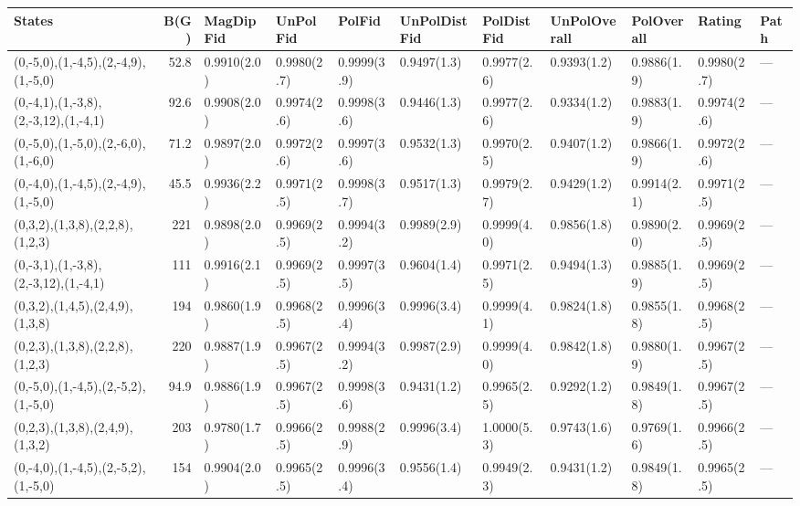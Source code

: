 \begin{tabular}{lrlllllllll}
\hline
 States                                &   B(G) & MagDipFid   & UnPolFid    & PolFid      & UnPolDistFid   & PolDistFid   & UnPolOverall   & PolOverall   & Rating      & Path   \\
\hline
 (0,-5,0),(1,-4,5),(2,-4,9),(1,-5,0)   &   52.8 & 0.9910(2.0) & 0.9980(2.7) & 0.9999(3.9) & 0.9497(1.3)    & 0.9977(2.6)  & 0.9393(1.2)    & 0.9886(1.9)  & 0.9980(2.7) & ---    \\
 (0,-4,1),(1,-3,8),(2,-3,12),(1,-4,1)  &   92.6 & 0.9908(2.0) & 0.9974(2.6) & 0.9998(3.6) & 0.9446(1.3)    & 0.9977(2.6)  & 0.9334(1.2)    & 0.9883(1.9)  & 0.9974(2.6) & ---    \\
 (0,-5,0),(1,-5,0),(2,-6,0),(1,-6,0)   &   71.2 & 0.9897(2.0) & 0.9972(2.6) & 0.9997(3.6) & 0.9532(1.3)    & 0.9970(2.5)  & 0.9407(1.2)    & 0.9866(1.9)  & 0.9972(2.6) & ---    \\
 (0,-4,0),(1,-4,5),(2,-4,9),(1,-5,0)   &   45.5 & 0.9936(2.2) & 0.9971(2.5) & 0.9998(3.7) & 0.9517(1.3)    & 0.9979(2.7)  & 0.9429(1.2)    & 0.9914(2.1)  & 0.9971(2.5) & ---    \\
 (0,3,2),(1,3,8),(2,2,8),(1,2,3)       &  221   & 0.9898(2.0) & 0.9969(2.5) & 0.9994(3.2) & 0.9989(2.9)    & 0.9999(4.0)  & 0.9856(1.8)    & 0.9890(2.0)  & 0.9969(2.5) & ---    \\
 (0,-3,1),(1,-3,8),(2,-3,12),(1,-4,1)  &  111   & 0.9916(2.1) & 0.9969(2.5) & 0.9997(3.5) & 0.9604(1.4)    & 0.9971(2.5)  & 0.9494(1.3)    & 0.9885(1.9)  & 0.9969(2.5) & ---    \\
 (0,3,2),(1,4,5),(2,4,9),(1,3,8)       &  194   & 0.9860(1.9) & 0.9968(2.5) & 0.9996(3.4) & 0.9996(3.4)    & 0.9999(4.1)  & 0.9824(1.8)    & 0.9855(1.8)  & 0.9968(2.5) & ---    \\
 (0,2,3),(1,3,8),(2,2,8),(1,2,3)       &  220   & 0.9887(1.9) & 0.9967(2.5) & 0.9994(3.2) & 0.9987(2.9)    & 0.9999(4.0)  & 0.9842(1.8)    & 0.9880(1.9)  & 0.9967(2.5) & ---    \\
 (0,-5,0),(1,-4,5),(2,-5,2),(1,-5,0)   &   94.9 & 0.9886(1.9) & 0.9967(2.5) & 0.9998(3.6) & 0.9431(1.2)    & 0.9965(2.5)  & 0.9292(1.2)    & 0.9849(1.8)  & 0.9967(2.5) & ---    \\
 (0,2,3),(1,3,8),(2,4,9),(1,3,2)       &  203   & 0.9780(1.7) & 0.9966(2.5) & 0.9988(2.9) & 0.9996(3.4)    & 1.0000(5.3)  & 0.9743(1.6)    & 0.9769(1.6)  & 0.9966(2.5) & ---    \\
 (0,-4,0),(1,-4,5),(2,-5,2),(1,-5,0)   &  154   & 0.9904(2.0) & 0.9965(2.5) & 0.9996(3.4) & 0.9556(1.4)    & 0.9949(2.3)  & 0.9431(1.2)    & 0.9849(1.8)  & 0.9965(2.5) & ---    \\

\end{tabular}
